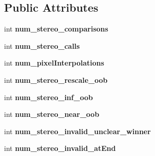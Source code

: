 \subsection*{Public Attributes}
\begin{DoxyCompactItemize}
\item 
\hypertarget{classlsd__slam_1_1_running_stats_a3ffa3606131f0e84d1baa57b0b14e736}{int {\bfseries num\-\_\-stereo\-\_\-comparisons}}\label{classlsd__slam_1_1_running_stats_a3ffa3606131f0e84d1baa57b0b14e736}

\item 
\hypertarget{classlsd__slam_1_1_running_stats_a14bb7c06477c1b139c3b26074290b887}{int {\bfseries num\-\_\-stereo\-\_\-calls}}\label{classlsd__slam_1_1_running_stats_a14bb7c06477c1b139c3b26074290b887}

\item 
\hypertarget{classlsd__slam_1_1_running_stats_a21bd82ff3888237a8fa5cfb8612adc2f}{int {\bfseries num\-\_\-pixel\-Interpolations}}\label{classlsd__slam_1_1_running_stats_a21bd82ff3888237a8fa5cfb8612adc2f}

\item 
\hypertarget{classlsd__slam_1_1_running_stats_a00d8e52e0b0be0017b69986cea2330d7}{int {\bfseries num\-\_\-stereo\-\_\-rescale\-\_\-oob}}\label{classlsd__slam_1_1_running_stats_a00d8e52e0b0be0017b69986cea2330d7}

\item 
\hypertarget{classlsd__slam_1_1_running_stats_a9834e14ca0d8a852fde16a5acd4302a0}{int {\bfseries num\-\_\-stereo\-\_\-inf\-\_\-oob}}\label{classlsd__slam_1_1_running_stats_a9834e14ca0d8a852fde16a5acd4302a0}

\item 
\hypertarget{classlsd__slam_1_1_running_stats_a639551f140700da5c64c8ea845ccb55a}{int {\bfseries num\-\_\-stereo\-\_\-near\-\_\-oob}}\label{classlsd__slam_1_1_running_stats_a639551f140700da5c64c8ea845ccb55a}

\item 
\hypertarget{classlsd__slam_1_1_running_stats_a17c81987dad49a1a791d3ce8619a3bea}{int {\bfseries num\-\_\-stereo\-\_\-invalid\-\_\-unclear\-\_\-winner}}\label{classlsd__slam_1_1_running_stats_a17c81987dad49a1a791d3ce8619a3bea}

\item 
\hypertarget{classlsd__slam_1_1_running_stats_aa702bd7825604257e1fcfa3b8961eef1}{int {\bfseries num\-\_\-stereo\-\_\-invalid\-\_\-at\-End}}\label{classlsd__slam_1_1_running_stats_aa702bd7825604257e1fcfa3b8961eef1}


\end{DoxyCompactItemize}
